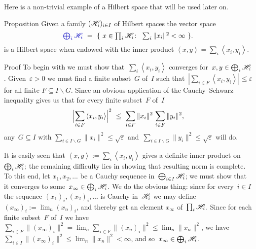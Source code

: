 \documentclass[a]{subfiles}
\begin{document}
\begin{parsec}%
\begin{point}%
Here is a non-trivial
example of a Hilbert space
that will be used later on.
\end{point}
\begin{point}{Proposition}%
Given a family  $(\mathscr{H}_i)_{i\in I}$ 
of Hilbert spaces
the vector space
\begin{equation*}
	\textstyle
	\Define{\bigoplus_i \scrH_i} \ =\ \{\ 
		x\in \prod_i \scrH_i\colon\ 
	\sum_i \|x_i\|^2 <\infty \ \}.
\end{equation*}
is a Hilbert space
when endowed with the inner product
$\left<x,y\right>=\sum_i \left<x_i,y_i\right>$.
\begin{point}{Proof}%
To begin with
we must show that~$\sum_i \left<x_i,y_i\right>$
converges for~$x,y\in\bigoplus_i \mathscr{H}_i$.
Given~$\varepsilon>0$
we must
find a finite subset~$G$ of~$I$
such that~$ \left|\sum_{i \in F} \left<x_i,y_i\right>\right|
\leq \varepsilon$ for all finite $F\subseteq I\backslash G$.
Since an obvious application
of the Cauchy--Schwarz inequality
gives
us that for every finite subset~$F$ of~$I$
\begin{equation*}
	\Bigl|\sum_{i\in F}
	\left<x_i,y_i\right>\Bigr|^2
	\ \leq\ 
	\sum_{i\in F}\|x_i\|^2
	\, \sum_{i\in F}\|y_i\|^2,
\end{equation*}
any~$G\subseteq I$
with $\sum_{i\in I\backslash G} \|x_i\|^2 \leq \sqrt{\varepsilon}$
	and~$\sum_{i\in I\backslash G} \|y_i\|^2 \leq \sqrt{\varepsilon}$
will do.

It is easily seen that
$\left<x,y\right>:=\sum_i \left<x_i,y_i\right>$
gives a definite inner product on~$\bigoplus_i \mathscr{H}_i$; the
remaining difficulty
lies in showing that resulting norm is complete.
To this end, let $x_1,x_2,\dotsc$ be a Cauchy sequence 
in~$\bigoplus_{i\in I}\mathscr{H}_i$;
we must show that it converges to some~$x_\infty\in \bigoplus_i \mathscr{H}_i$.
We do the obvious thing:
since for every~$i\in I$
the sequence $(x_1)_i, (x_2)_i,\dotsc$
is Cauchy in~$\mathscr{H}_i$
we may define $(x_\infty)_i:=\lim_n (x_n)_i$,
and thereby get an element $x_\infty$ of~$\prod_i \mathscr{H}_i$.
Since for each finite subset~$F$ of~$I$
we have $\sum_{i\in F} \|(x_\infty)_i\|^2
=\lim_n \sum_{i\in F} \|(x_n)_i\|^2
\leq \lim_n \|x_n\|^2$,
we have $\sum_{i\in I} \|(x_\infty)_i\|^2 
\leq \lim_n \|x_n\|^2 <\infty$,
and so~$x_\infty\in\bigoplus_i \mathscr{H}_i$.


\end{point}
\end{point}
\end{parsec}
\end{document}

